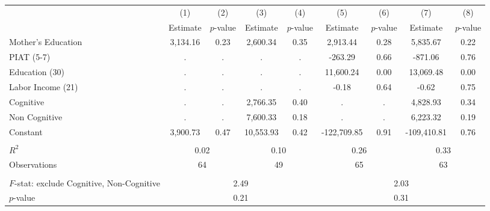 \begin{tabular}{lcccccccc} \toprule
 & (1) & (2) & (3) & (4) & (5) & (6) & (7) & (8) \\
 & Estimate & $p$-value & Estimate & $p$-value  & Estimate & $p$-value  & Estimate & $p$-value  \\ \midrule 
Mother's Education &     3,134.16 &         0.23 &     2,600.34 &         0.35 &     2,913.44 &         0.28 &     5,835.67 &         0.22 \\  
PIAT (5-7) &            . &            . &            . &            . &      -263.29 &         0.66 &      -871.06 &         0.76 \\  
Education (30) &            . &            . &            . &            . &    11,600.24 &         0.00 &    13,069.48 &         0.00 \\  
Labor Income (21) &            . &            . &            . &            . &        -0.18 &         0.64 &        -0.62 &         0.75 \\  
Cognitive &            . &            . &     2,766.35 &         0.40 &            . &            . &     4,828.93 &         0.34 \\  
Non Cognitive &            . &            . &     7,600.33 &         0.18 &            . &            . &     6,223.32 &         0.19 \\  
Constant &     3,900.73 &         0.47 &    10,553.93 &         0.42 &  -122,709.85 &         0.91 &  -109,410.81 &         0.76 \\  \\ \midrule
$R^2$ &         \multicolumn{2}{c}{0.02} &          \multicolumn{2}{c}{0.10} &          \multicolumn{2}{c}{0.26} &             \multicolumn{2}{c}{0.33} \\ 
Observations &         \multicolumn{2}{c}{64} &         \multicolumn{2}{c}{49} &                \multicolumn{2}{c}{65} &       \multicolumn{2}{c}{63}  \\   \\ \midrule
$F$-stat: exclude Cognitive, Non-Cognitive &             \multicolumn{4}{c}{2.49} &              \multicolumn{4}{c}{2.03}  \\  
$p$-value &                 \multicolumn{4}{c}{0.21} &                   \multicolumn{4}{c}{0.31}  \\    \bottomrule \end{tabular}

